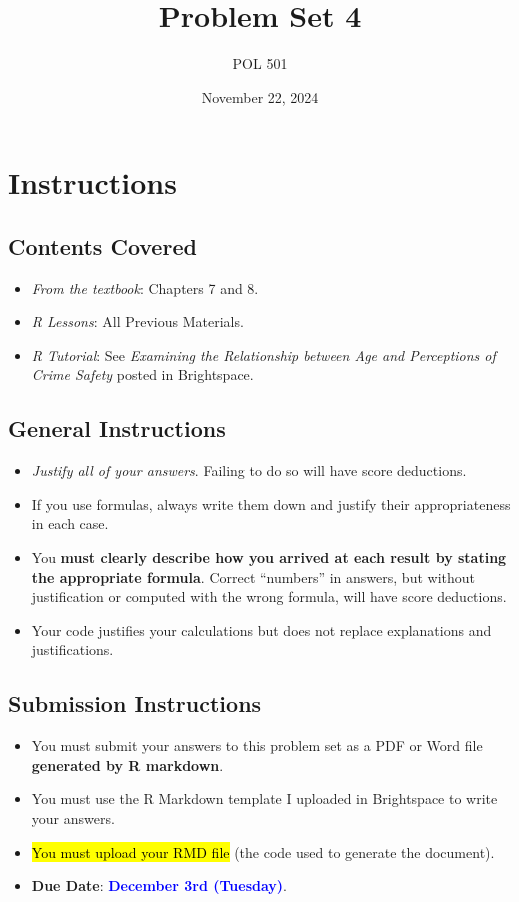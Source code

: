 \documentclass[a4paper, 11pt]{article}
\title{Problem Set 4}
\author{POL 501}
\date{November 22, 2024}
\begin{document}
\maketitle

\section*{Instructions}
\subsection*{Contents Covered}
\begin{itemize}
    \item \emph{From the textbook}: Chapters 7 and 8.
    \item \emph{R Lessons}: All Previous Materials.
    \item \emph{R Tutorial}: See \emph{Examining the Relationship between Age and Perceptions of Crime Safety} posted in Brightspace. 
\end{itemize}
\subsection*{General Instructions}
\begin{itemize}
    \item \emph{Justify all of your answers}. Failing to do so will have score deductions.
    \item If you use formulas, always write them down and justify their appropriateness in each case.
    \item You \textbf{must clearly describe how you arrived at each result by stating the appropriate formula}. Correct ``numbers'' in answers, but without justification or computed with the wrong formula, will have score deductions.
    \item Your code justifies your calculations but does not replace explanations and justifications.
\end{itemize}
\subsection*{Submission Instructions}
\begin{itemize}
    \item You must submit your answers to this problem set as a PDF or Word file \textbf{generated by R markdown}.
    \item You must use the R Markdown template I uploaded in Brightspace to write your answers.
    \item \hl{You must upload your RMD file} (the code used to generate the document). 
    \item \textbf{Due Date}: \textcolor{blue}{\textbf{December 3rd (Tuesday)}}.
\end{itemize}
\end{document}
